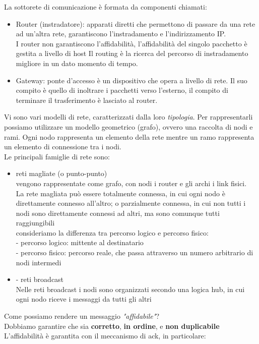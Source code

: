 \documentclass[11pt, oneside]{article}   	%
\begin{document}
La sottorete di comunicazione è formata da componenti chiamati:\begin{itemize}
\item Router (instradatore): apparati diretti che permettono di passare da una rete ad un’altra rete, garantiscono l'instradamento e l'indirizzamento IP.\\
I router non garantiscono l'affidabilità, l'affidabilità del singolo pacchetto è gestita a livello di host
Il routing è la ricerca del percorso di instradamento migliore in un dato momento di tempo.
\item Gateway: ponte d'accesso è un dispositivo che opera a livello di rete. Il suo compito è quello di inoltrare i pacchetti verso l'esterno, il compito di terminare il trasferimento è lasciato al router.
\end{itemize}
Vi sono vari modelli di rete, caratterizzati dalla loro \emph{tipologia}. Per rappresentarli possiamo utilizzare un modello geometrico (grafo), ovvero una raccolta di nodi e rami. Ogni nodo rappresenta un elemento della rete mentre un ramo rappresenta un elemento di connessione tra i nodi.\\
Le principali famiglie di rete sono:
\begin{itemize}
\item reti magliate (o punto-punto)\\
vengono rappresentate come grafo, con nodi i router e gli archi i link fisici.\\
La rete magliata può essere totalmente connessa, in cui ogni nodo è direttamente connesso all'altro; o parzialmente connessa, in cui non tutti i nodi sono direttamente connessi ad altri, ma sono comunque tutti raggiungibili\\
{\footnotesize consideriamo la differenza tra percorso logico e percorso fisico:\\
- percorso logico: mittente al destinatario\\
- percorso fisico: percorso reale, che passa attraverso un numero arbitrario di nodi intermedi}
\item - reti broadcast\\
Nelle reti broadcast i nodi sono organizzati secondo una logica hub, in cui ogni nodo riceve i messaggi da tutti gli altri
\end{itemize}

Come possiamo rendere un messaggio \emph{"affidabile"}?\\
Dobbiamo garantire che sia \textbf{corretto}, \textbf{in ordine}, e \textbf{non duplicabile}\\
L'affidabilità è garantita con il meccanismo di ack, in particolare:
\end{document}
